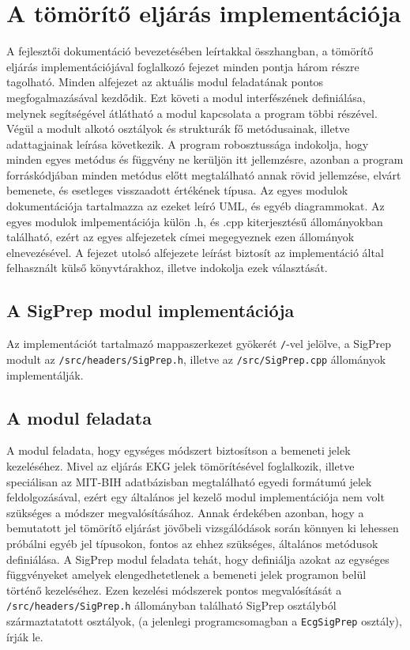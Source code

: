 \documentclass[oneside,titlepage,12pt,a4paper]{report}
\begin{document}
\section{A tömörítő eljárás implementációja} \label{sec::modimpl}

A fejlesztői dokumentáció bevezetésében leírtakkal összhangban, a tömörítő eljárás implementációjával foglalkozó fejezet minden pontja három részre tagolható. Minden alfejezet az aktuális modul feladatának pontos megfogalmazásával kezdődik. Ezt követi a modul interfészének definiálása, melynek segítségével átlátható a modul kapcsolata a program többi részével. Végül a modult alkotó osztályok és strukturák fő metódusainak, illetve adattagjainak leírása következik. A program robosztussága indokolja, hogy minden egyes metódus és függvény ne kerüljön itt jellemzésre, azonban a program forráskódjában minden metódus előtt megtalálható annak rövid jellemzése, elvárt bemenete, és esetleges visszaadott értékének típusa. Az egyes modulok dokumentációja tartalmazza az ezeket leíró UML, és egyéb diagrammokat. Az egyes modulok imlpementációja külön .h, és .cpp kiterjesztésű állományokban található, ezért az egyes alfejezetek címei megegyeznek ezen állományok elnevezésével. A fejezet utolsó alfejezete leírást biztosít az implementáció által felhasznált külső könyvtárakhoz, illetve indokolja ezek választását.

\subsection{A SigPrep modul implementációja} \label{subsec::SigPrep}

Az implementációt tartalmazó mappaszerkezet gyökerét \texttt{/}-vel jelölve, a SigPrep modult  az \texttt{/src/headers/SigPrep.h}, illetve az \texttt{/src/SigPrep.cpp} állományok implementálják. 

\subsection*{A modul feladata}

\par A modul feladata, hogy egységes módszert biztosítson a bemeneti jelek kezeléséhez. 
Mivel az eljárás EKG jelek tömörítésével foglalkozik, illetve speciálisan az MIT-BIH adatbázisban megtalálható egyedi formátumú jelek feldolgozásával, 
ezért egy általános jel kezelő modul implementációja nem volt szükséges a módszer megvalósításához. Annak érdekében azonban, 
hogy a bemutatott jel tömörítő eljárást jövőbeli vizsgálódások során könnyen ki lehessen próbálni egyéb jel típusokon, fontos az ehhez szükséges, általános metódusok definiálása. A SigPrep modul feladata tehát, hogy definiálja azokat az egységes függvényeket amelyek elengedhetetlenek a bemeneti jelek programon belül történő kezeléséhez. Ezen kezelési módszerek pontos megvalósítását a \texttt{/src/headers/SigPrep.h} állományban található SigPrep osztályból származtatatott osztályok, (a jelenlegi programcsomagban a \texttt{EcgSigPrep} osztály), írják le. 
\end{document}
